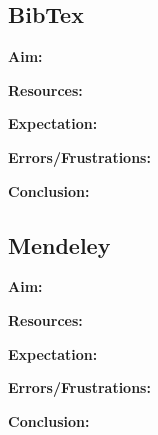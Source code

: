 \documentclass{article}
\begin{document}
\subsection{BibTex}

\textbf{Aim:}

\textbf{Resources:}

\textbf{Expectation:}

\label{Error: BibTex Errors/Frustrations}
\textbf{Errors/Frustrations:}

\textbf{Conclusion:}

\subsection{Mendeley}

\textbf{Aim:}

\textbf{Resources:}

\textbf{Expectation:}

\label{Error: Mendeley Errors/Frustrations}
\textbf{Errors/Frustrations:}

\textbf{Conclusion:}
\end{document}
